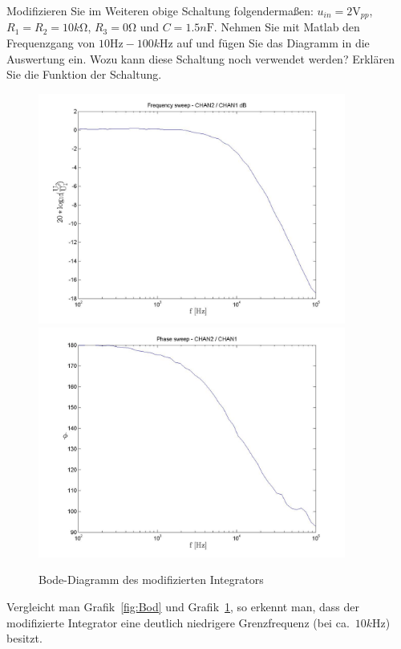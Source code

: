 \documentclass[10pt]{scrreprt}
\begin{document}
    \vspace{1cm}

    Modifizieren Sie im Weiteren obige Schaltung folgendermaßen:
    $u_{in} = 2\si{\volt}_{pp}$, $R_1 = R_2 = 10\si{k\ohm}$, $R_3 = 0\si{\ohm}$ und $C = 1.5\si{n\farad}$.
    Nehmen Sie mit Matlab den Frequenzgang von $10\si{\hertz} - 100\si{k\hertz}$ auf und fügen Sie das
    Diagramm in die Auswertung ein. Wozu kann diese Schaltung noch verwendet werden?
    Erklären Sie die Funktion der Schaltung.
    \begin{center}
        \begin{figure}[H]
            \includegraphics[width=0.9\textwidth]{FS542_frequencysweep_ylogxlog.jpg}
            \includegraphics[width=0.9\textwidth]{PS542_phasesweep_xlog.jpg}
            \caption{Bode-Diagramm des modifizierten Integrators}
            \label{fig:BodMod}
        \end{figure}
    \end{center}
    Vergleicht man Grafik~\ref{fig:Bod} und Grafik~\ref{fig:BodMod}, so  erkennt
    man, dass der modifizierte Integrator eine deutlich niedrigere Grenzfrequenz
    (bei ca.~$10\si{k\hertz}$) besitzt.
\end{document}
